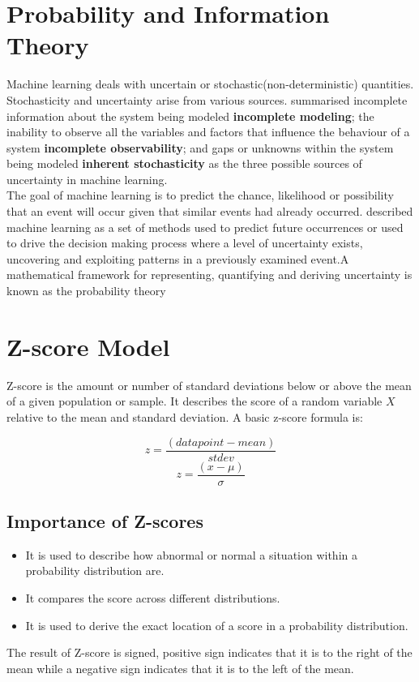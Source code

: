 \documentclass[12pt, letterpaper, titlepage]{report}
\begin{document}
\section{Probability and Information Theory}
Machine learning deals with uncertain or stochastic(non-deterministic) quantities. Stochasticity and uncertainty arise from various sources. \cite{goodfellow2016deep} summarised incomplete information about the system being modeled \textbf{incomplete modeling}; the inability to observe all the variables and factors that influence the behaviour of a system \textbf{incomplete observability}; and gaps or unknowns within the system being modeled \textbf{inherent stochasticity} as the three possible sources of uncertainty in machine learning.\\
The goal of machine learning is to predict the chance, likelihood or possibility that an event will occur given that similar events had already occurred. \cite{Murphy2012} described machine learning as a set of methods used to predict future occurrences or used to drive the decision making process where a level of uncertainty exists, uncovering and exploiting patterns in a previously examined event.A mathematical framework for representing, quantifying and deriving uncertainty is known as the probability theory \citep{goodfellow2016deep}  
\section{Z-score Model}
Z-score is the amount or number of standard deviations below or above the mean of a given population or sample. It describes the score of a random variable $X$ relative to the mean and standard deviation.
A basic z-score formula is:

$$z=\dfrac{(datapoint - mean)}{stdev}$$
$$z=\dfrac{(x-\mu)}{\sigma}$$


\subsection{Importance of Z-scores}
\begin{itemize}
	\item It is used to describe how abnormal or normal a situation within a probability distribution are.
	\item It compares the score across different distributions.
	\item It is used to derive the exact location of a score in a probability distribution.
\end{itemize}	
The result of Z-score is signed, positive sign indicates that it is to the right of the mean while a negative sign indicates that it is to the left of the mean.
\end{document}
